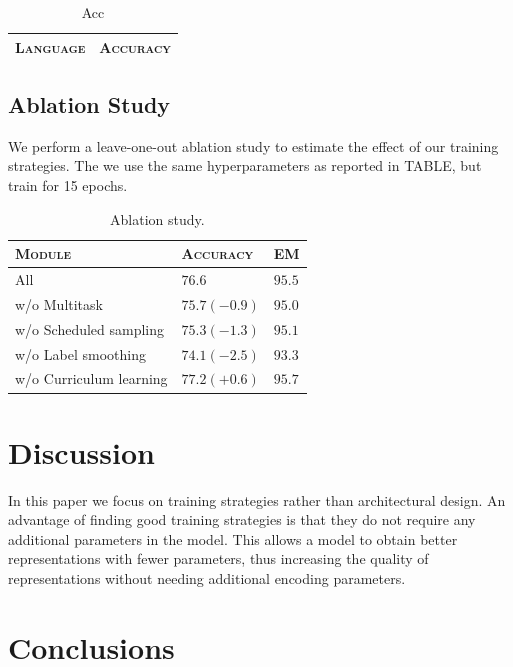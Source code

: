 \documentclass[11pt,a4paper]{article}
\begin{document}
\begin{table}[h]	
\centering
\begin{tabular}{lc}
\textsc{Language} & \textsc{Accuracy} \\
  \hline
  
\end{tabular} 
\caption{Acc}
\label{tab:accuracy}
\end{table}



\subsection{Ablation Study}

We perform a leave-one-out ablation study to estimate the effect of
our training strategies. The we use the same hyperparameters as
reported in TABLE, but train for 15 epochs.



\begin{table}[h]	
\centering
\begin{tabular}{lll}
\textsc{Module} & \textsc{Accuracy} & \textsc{EM} \\
  \hline
  All  & $76.6$ & $95.5$ \\
  w/o Multitask & $75.7 (-0.9)$ & $95.0$ \\
  w/o Scheduled sampling & $75.3 (-1.3)$ & $95.1$ \\
  w/o Label smoothing & $74.1 (-2.5)$ & $93.3$ \\
  w/o Curriculum learning & $77.2 (+0.6)$ & $95.7$ \\
\end{tabular} 
\caption{Ablation study.}
\label{tab:abl}
\end{table}

\section{Discussion}

In this paper we focus on training strategies rather than
architectural design. An advantage of finding good training strategies
is that they do not require any additional parameters in the
model. This allows a model to obtain better representations with fewer
parameters, thus increasing the quality of representations without
needing additional encoding parameters.  

\section{Conclusions}







\end{document}
